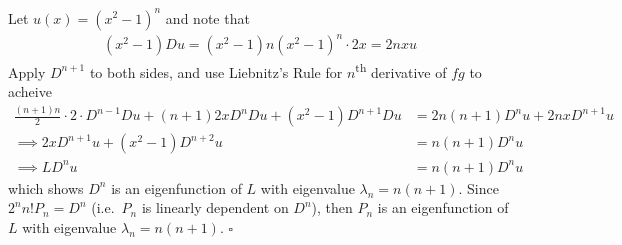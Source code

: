 \documentclass[12pt]{article}
\theoremstyle{plain}
\begin{document}
Let $u(x) = (x^2 - 1)^n$ and note that
\begin{align*}
    (x^2 - 1)Du = (x^2 - 1)n(x^2 - 1)^n\cdot 2x = 2nxu
\end{align*}
Apply $D^{n+1}$ to both sides, and use Liebnitz's Rule for $n$\textsuperscript{th} derivative of $fg$ to acheive
\begin{align*}
    \frac{(n+1)n}{2}\cdot2\cdot D^{n-1}Du + (n+1)2xD^nDu + (x^2 - 1)D^{n+1}Du &= 2n(n+1)D^nu + 2nxD^{n+1}u \\
    \implies 2xD^{n+1}u + (x^2 - 1)D^{n+2}u &= n(n+1)D^nu \\
    \implies LD^nu &= n(n+1)D^nu
\end{align*}
which shows $D^n$ is an eigenfunction of $L$ with eigenvalue $\lambda_n = n(n+1)$.  Since $2^n n!P_n = D^n$ (i.e.~$P_n$ is linearly dependent on $D^n$), then $P_n$ is an eigenfunction of $L$ with eigenvalue $\lambda_n = n(n+1)$. \hfill $\square$
\end{document}
